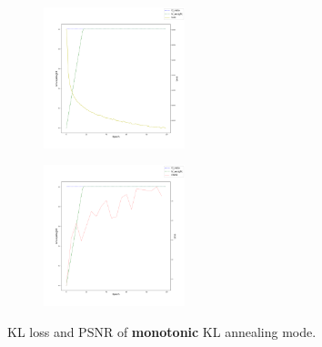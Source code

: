 	\begin{figure}[H]
		\centering
		\begin{subfigure}
			\centering
			\includegraphics[width=0.45\textwidth]{img/loss_mono.png}
			\label{loss-mono}
		\end{subfigure}
		\hfill
		\begin{subfigure}
			\centering
			\includegraphics[width=0.45\textwidth]{img/psnr_mono.png}
			\label{psnr-mono}
		\end{subfigure}
		\hfill
		\caption{KL loss and PSNR of \textbf{monotonic} KL annealing mode.}
		\label{result-mono}
	\end{figure}

